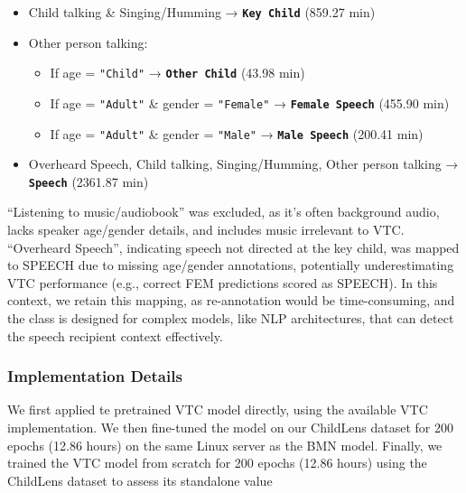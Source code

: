 \documentclass[
  man,floatsintext]{apa6}
\providecommand{\tightlist}{%
  \setlength{\itemsep}{0pt}\setlength{\parskip}{0pt}}
\begin{document}
\begin{itemize}
\tightlist
\item
  Child talking \& Singing/Humming → \textbf{\texttt{Key\ Child}} (859.27 min)
\item
  Other person talking:

  \begin{itemize}
  \tightlist
  \item
    If age = \texttt{"Child"} → \textbf{\texttt{Other\ Child}} (43.98 min)
  \item
    If age = \texttt{"Adult"} \& gender = \texttt{"Female"} → \textbf{\texttt{Female\ Speech}} (455.90 min)
  \item
    If age = \texttt{"Adult"} \& gender = \texttt{"Male"} → \textbf{\texttt{Male\ Speech}} (200.41 min)
  \end{itemize}
\item
  Overheard Speech, Child talking, Singing/Humming, Other person talking → \textbf{\texttt{Speech}} (2361.87 min)
\end{itemize}

``Listening to music/audiobook'' was excluded, as it's often background audio, lacks speaker age/gender details, and includes music irrelevant to VTC. ``Overheard Speech'', indicating speech not directed at the key child, was mapped to SPEECH due to missing age/gender annotations, potentially underestimating VTC performance (e.g., correct FEM predictions scored as SPEECH). In this context, we retain this mapping, as re-annotation would be time-consuming, and the class is designed for complex models, like NLP architectures, that can detect the speech recipient context effectively.

\subsubsection{Implementation Details}\label{implementation-details-1}

We first applied te pretrained VTC model directly, using the available VTC implementation. We then fine-tuned the model on our ChildLens dataset for 200 epochs (12.86 hours) on the same Linux server as the BMN model. Finally, we trained the VTC model from scratch for 200 epochs (12.86 hours) using the ChildLens dataset to assess its standalone value
\end{document}
